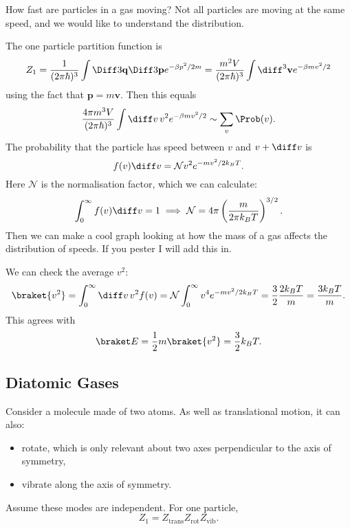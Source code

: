 \documentclass[12pt]{article}
\begin{document}
How fast are particles in a gas moving? Not all particles are moving at the same speed, and we would like to understand the distribution.

The one particle partition function is
\[
Z_1 = \frac{1}{(2 \pi \hbar)^3} \int\Diff3\mathbf{q} \Diff3\mathbf{p}e^{-\beta p^2/2m} = \frac{m^2 V}{(2\pi \hbar)^3} \int \diff^3\mathbf{v} e^{-\beta mv^2/2}
\]
using the fact that $\mathbf{p} = m \mathbf{v}$. Then this equals
\[
\frac{4 \pi m^3 V}{(2 \pi\hbar)^3}\int \diff v\, v^2 e^{-\beta m v^2/2} \sim \sum_{v} \Prob(v).
\]
The probability that the particle has speed between $v$ and $v + \diff v$ is
\[
f(v) \diff v = \mathcal{N} v^2 e^{-mv^2/2k_BT}.
\]
Here $\mathcal{N}$ is the normalisation factor, which we can calculate:
\[
\int_0^{\infty} f(v) \diff v = 1 \implies \mathcal{N} = 4\pi \left( \frac{m}{2 \pi k_B T}\right)^{3/2}.
\]
Then we can make a cool graph looking at how the mass of a gas affects the distribution of speeds. If you pester I will add this in.

We can check the average $v^2$:
\[
	\braket{v^2} = \int_0^\infty \diff v\, v^2 f(v)= \mathcal{N} \int_0^{\infty}v^4 e^{-mv^2/2k_BT} = \frac{3}{2} \frac{2k_B T}{m} = \frac{3 k_B T}{m}.
\]
This agrees with
\[
	\braket E = \frac{1}{2} m \braket{v^2} = \frac{3}{2} k_B T.
\]

\subsection{Diatomic Gases}
\label{sub:digas}

Consider a molecule made of two atoms. As well as translational motion, it can also:
\begin{itemize}
	\item rotate, which is only relevant about two axes perpendicular to the axis of symmetry,
	\item vibrate along the axis of symmetry.
\end{itemize}
Assume these modes are independent. For one particle,
\[
Z_1 = Z_{\mathrm{trans}}Z_{\mathrm{rot}}Z_{\mathrm{vib}}.
\]
\end{document}
